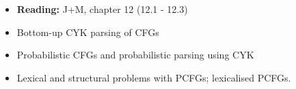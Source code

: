 \begin{frame}

  \begin{itemize}
  \item \textbf{Reading:} J+M, chapter 12 (12.1 - 12.3)
  \item Bottom-up CYK parsing of CFGs
  \item Probabilistic CFGs and probabilistic parsing using CYK
  \item Lexical and structural problems with PCFGs;  lexicalised
    PCFGs. 
  \end{itemize}
\end{frame}






















































